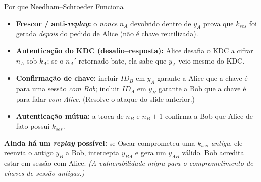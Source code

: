 \documentclass{beamer}
\begin{document}
\begin{frame}{Por que Needham--Schroeder Funciona}
    \begin{itemize}
        \footnotesize
        \item \textbf{Frescor / anti-\textit{replay}:} o \textit{nonce} $n_A$ devolvido dentro de $y_A$ prova que $k_{ses}$ foi gerada \emph{depois} do pedido de Alice (não é chave reutilizada).
        \item \textbf{Autenticação do KDC (desafio--resposta):} Alice desafia o KDC a cifrar $n_A$ sob $k_A$; se o $n_A'$ retornado bate, ela sabe que $y_A$ veio mesmo do KDC.
        \item \textbf{Confirmação de chave:} incluir $ID_B$ em $y_A$ garante a Alice que a chave é para uma sessão \emph{com Bob}; incluir $ID_A$ em $y_B$ garante a Bob que a chave é para falar \emph{com Alice}. (Resolve o ataque do slide anterior.)
        \item \textbf{Autenticação mútua:} a troca de $n_B$ e $n_B+1$ confirma a Bob que Alice de fato possui $k_{ses}$.
    \end{itemize}
    \medskip
    \begin{tcolorbox}[colback=red!5,colframe=red!60!black,boxrule=0.5pt]
        \footnotesize
        \textbf{Ainda há um \textit{replay} possível:} se Oscar comprometeu uma $k_{ses}$ \emph{antiga}, ele reenvia o antigo $y_B$ a Bob, intercepta $y_{BA}$ e gera um $y_{AB}$ válido. Bob acredita estar em sessão com Alice. \emph{(A vulnerabilidade migra para o comprometimento de chaves de sessão antigas.)}
    \end{tcolorbox}
\end{frame}
\end{document}
